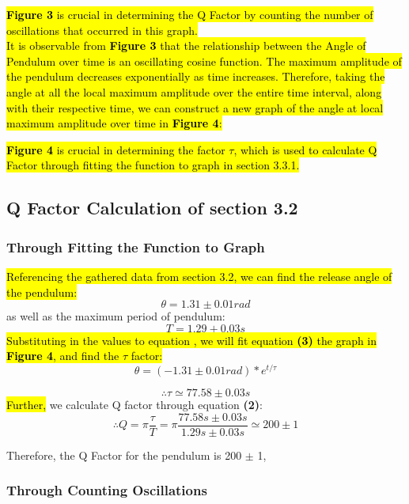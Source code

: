 \documentclass{article}
\begin{document}
\hl{\textbf{Figure 3} is crucial in determining the Q Factor by counting the number of oscillations that occurred in this graph. \\}
\indent \hl{ It is observable from \textbf{Figure 3} that the relationship between the Angle of Pendulum over time is an oscillating cosine function. The maximum amplitude of the pendulum decreases exponentially as time increases. Therefore, taking the angle at all the local maximum amplitude over the entire time interval, along with their respective time, we can construct a new graph of the angle at local maximum amplitude over time in \textbf{Figure 4}: }

\begin{figure}[!htb]
	
\end{figure}

\hl{ \textbf{Figure 4} is crucial in determining the factor $\tau$, which is used to calculate Q Factor through fitting the function to graph in section 3.3.1. }

\subsection{Q Factor Calculation of section 3.2}

\subsubsection{Through Fitting the Function to Graph}

\hl{ Referencing the gathered data from section 3.2, we can find the release angle of the pendulum:}
$$ \theta = 1.31 \pm 0.01rad $$
as well as the maximum period of pendulum:
$$ T = 1.29 \pm 0.03s $$
\hl{ Substituting in the values to equation , we will fit equation \textbf{(3)} the graph in \textbf{Figure 4}, and find the $\tau$ factor:}
\begin{equation}
 \theta = (-1.31 \pm0.01rad) * e^{t/\tau} 
\end{equation}

$$ \therefore \tau \simeq 77.58 \pm 0.03s $$
\hl{ Further, }we calculate Q factor through equation \textbf{(2)}:
$$ \therefore Q=\pi \frac{\tau}{T}=\pi \frac{77.58s \pm 0.03s}{1.29s \pm 0.03s} \simeq 200 \pm 1$$

\noindent Therefore, the Q Factor for the pendulum is 200 $\pm$ 1,
\subsubsection{Through Counting Oscillations}
\end{document}
